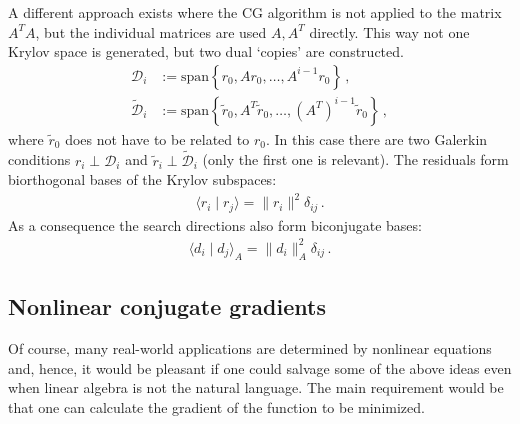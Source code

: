     A different approach exists where the CG algorithm is not applied to the matrix $A^T\!A$, but the individual matrices are used $A,A^T$ directly. This way not one Krylov space is generated, but two dual `copies' are constructed.
    \begin{align*}
        \mathcal{D}_i &:= \mathrm{span}\left\{r_0,Ar_0,\ldots,A^{i-1}r_0\right\}\,,\\
        \widetilde{\mathcal{D}}_i &:= \mathrm{span}\left\{\widetilde{r}_0,A^T\widetilde{r}_0,\ldots,(A^T)^{i-1}\widetilde{r}_0\right\}\,,
    \end{align*}
    where $\widetilde{r}_0$ does not have to be related to $r_0$. In this case there are two Galerkin conditions $r_i\perp\mathcal{D}_i$ and $\widetilde{r}_i\perp\widetilde{\mathcal{D}}_i$ (only the first one is relevant). The residuals form biorthogonal bases of the Krylov subspaces:
    \begin{gather}
        \langle r_i\mid r_j \rangle = \|r_i\|^2\delta_{ij}\,.
    \end{gather}
    As a consequence the search directions also form biconjugate bases:
    \begin{gather}
        \langle d_i\mid d_j \rangle_A = \|d_i\|_A^2\delta_{ij}\,.
    \end{gather}

\subsection{Nonlinear conjugate gradients}

    Of course, many real-world applications are determined by nonlinear equations and, hence, it would be pleasant if one could salvage some of the above ideas even when linear algebra is not the natural language. The main requirement would be that one can calculate the gradient of the function to be minimized.

